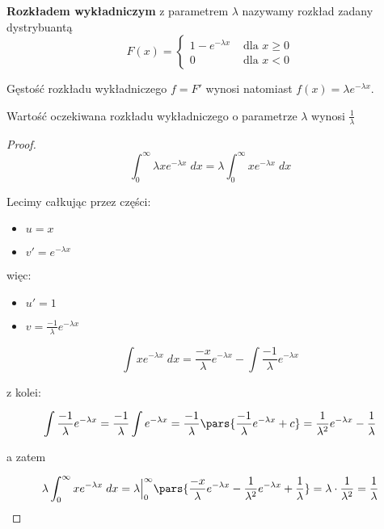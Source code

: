 \begin{definition}
	\textbf{Rozkładem wykładniczym} z parametrem \( \lambda \) nazywamy rozkład zadany dystrybuantą
	\[
		F(x) = \begin{cases}
			1 - e^{-\lambda x} & \text{ dla } x \geq 0 \\
			0                  & \text{ dla } x < 0
		\end{cases}
	\]
\end{definition}

Gęstość rozkładu wykładniczego \( f = F' \) wynosi natomiast \( f(x) = \lambda e^{-\lambda x} \).

\begin{lemma}
	Wartość oczekiwana rozkładu wykładniczego o parametrze \( \lambda \) wynosi \( \frac{1}{\lambda} \)
\end{lemma}
\begin{proof}
	\[
		\int_{0}^{\infty} \lambda x e^{-\lambda x} \; dx = \lambda \int_{0}^{\infty} x e^{-\lambda x} \; dx
	\]

	Lecimy całkując przez części:

	\begin{itemize}
		\item \(u =  x\)
		\item \(v' = e^{-\lambda x}\)
	\end{itemize}

	więc:

	\begin{itemize}
		\item \(u' = 1\)
		\item \(v = \frac{-1}{\lambda} e^{-\lambda x}\)
	\end{itemize}

	\[
		\int x e^{-\lambda x} \; dx = \frac{-x}{\lambda} e^{-\lambda x} - \int \frac{-1}{\lambda} e^{-\lambda x}
	\]

	z kolei:

	\[
		\int \frac{-1}{\lambda} e^{-\lambda x} = \frac{-1}{\lambda} \int e^{-\lambda x} = \frac{-1}{\lambda} \pars{\frac{-1}{\lambda} e^{-\lambda x} + c} = \frac{1}{\lambda^2} e^{-\lambda x} - \frac{1}{\lambda}
	\]

	a zatem

	\[
		\lambda \int_{0}^{\infty} x e^{-\lambda x} \; dx = \lambda \Big\rvert_{0}^{\infty} \pars{\frac{-x}{\lambda} e^{-\lambda x} - \frac{1}{\lambda^2} e^{-\lambda x} + \frac{1}{\lambda} } = \lambda \cdot \frac{1}{\lambda^2} = \frac{1}{\lambda}
	\]
\end{proof}



